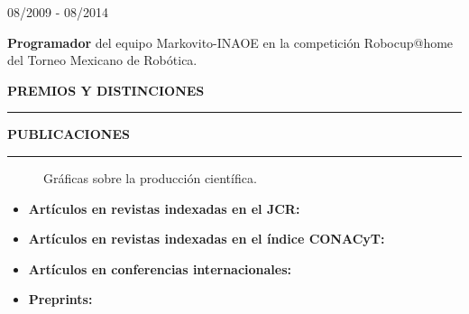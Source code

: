 \documentclass[10pt]{article}
\begin{document}
\begin{minipage}{1.5 in}
08/2009 - 08/2014\\
\end{minipage}
\begin{minipage}{4.5in}
\textbf{Programador} del equipo Markovito-INAOE en la competición Robocup@home del Torneo Mexicano de Robótica.\\ 
\end{minipage}

{\bf PREMIOS Y DISTINCIONES}
\vspace{3pt}
\hrule
 

{\bf PUBLICACIONES}
\vspace{3pt}
\hrule

\begin{figure}[t]
	\hfill
	\caption{Gráficas sobre la producción científica.}
	\label{fig:dummy}
\end{figure}


\begin{itemize}
	\item \textbf{Artículos en revistas indexadas en el JCR:}
	
	
	\item \textbf{Artículos en revistas indexadas en el índice CONACyT:}
	
	
	\item \textbf{Artículos en conferencias internacionales:}
	
	
	\item \textbf{Preprints:}
	
\end{itemize} 
\end{document}
